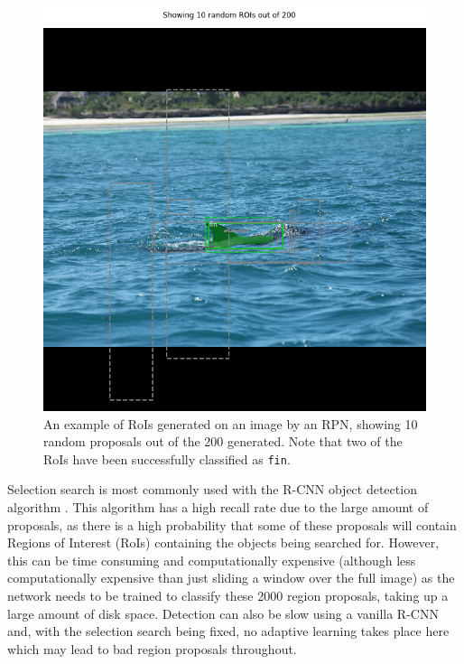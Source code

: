 \begin{figure}
	\begin{center}
		\includegraphics[scale=0.45]{Chapter2/figs/rpn-ten-random.png}
	\end{center}
	\caption{An example of RoIs generated on an image by an RPN, showing 10 random proposals out of the 200 generated. Note that two of the RoIs have been successfully classified as \texttt{fin}.}
	\label{fig:rpn-randoms}
\end{figure}

Selection search is most commonly used with the R-CNN object detection algorithm \cite{girshick_rich_2014}. This algorithm has a high recall rate due to the large amount of proposals, as there is a high probability that some of these proposals will contain Regions of Interest (RoIs) containing the objects being searched for. However, this can be time consuming and computationally expensive (although less computationally expensive than just sliding a window over the full image) as the network needs to be trained to classify these 2000 region proposals, taking up a large amount of disk space. Detection can also be slow using a vanilla R-CNN and, with the selection search being fixed, no adaptive learning takes place here which may lead to bad region proposals throughout. 

